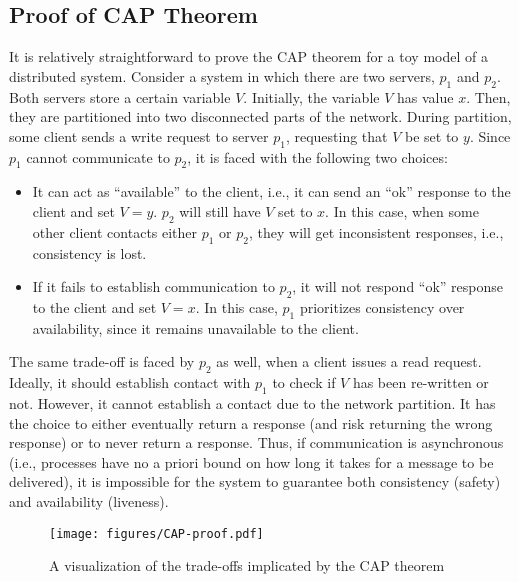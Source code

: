 \documentclass{article}
\begin{document}
\subsection*{Proof of CAP Theorem}
It is relatively straightforward to prove the CAP theorem for a toy model of a distributed system. Consider a system in which there are two servers, $p_1$ and $p_2$. Both servers store a certain variable $V$. Initially, the variable $V$ has value $x$. Then, they are partitioned into two disconnected parts of the network. During partition, some client sends a write request to server $p_1$, requesting that $V$ be set to $y$. Since $p_1$ cannot communicate to $p_2$, it is faced with the following two choices:
\begin{itemize}
    \item It can act as ``available'' to the client, i.e., it can send an ``ok'' response to the client and set $V = y$. $p_2$ will still have $V$ set to $x$. In this case, when some other client contacts either $p_1$ or $p_2$, they will get inconsistent responses, i.e., consistency is lost.
    \item If it fails to establish communication to $p_2$, it will not respond ``ok'' response to the client and set $V = x$. In this case, $p_1$ prioritizes consistency over availability, since it remains unavailable to the client.
\end{itemize}
The same trade-off is faced by $p_2$ as well, when a client issues a read request. Ideally, it should establish contact with $p_1$ to check if $V$ has been re-written or not. However, it cannot establish a contact due to the network partition. It has the choice to either eventually return a response (and risk returning the wrong response) or to never return a response. Thus, if communication is asynchronous (i.e., processes have no a priori bound on how long it takes for a message to be delivered), it is impossible for the system to guarantee both consistency (safety) and availability (liveness).
\begin{figure}
    \centering
    \texttt{[image: figures/CAP-proof.pdf]}
    \caption{A visualization of the trade-offs implicated by the CAP theorem}
    \label{fig:cap_thm_proof}
\end{figure}
\end{document}
